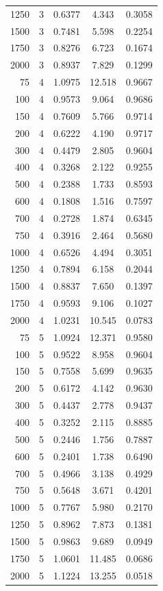 \begin{longtable}{rrccc}
1250 & 3 & 0.6377 & 4.343 & 0.3058 \\
1500 & 3 & 0.7481 & 5.598 & 0.2254 \\
1750 & 3 & 0.8276 & 6.723 & 0.1674 \\
2000 & 3 & 0.8937 & 7.829 & 0.1299 \\
75 & 4 & 1.0975 & 12.518 & 0.9667 \\
100 & 4 & 0.9573 & 9.064 & 0.9686 \\
150 & 4 & 0.7609 & 5.766 & 0.9714 \\
200 & 4 & 0.6222 & 4.190 & 0.9717 \\
300 & 4 & 0.4479 & 2.805 & 0.9604 \\
400 & 4 & 0.3268 & 2.122 & 0.9255 \\
500 & 4 & 0.2388 & 1.733 & 0.8593 \\
600 & 4 & 0.1808 & 1.516 & 0.7597 \\
700 & 4 & 0.2728 & 1.874 & 0.6345 \\
750 & 4 & 0.3916 & 2.464 & 0.5680 \\
1000 & 4 & 0.6526 & 4.494 & 0.3051 \\
1250 & 4 & 0.7894 & 6.158 & 0.2044 \\
1500 & 4 & 0.8837 & 7.650 & 0.1397 \\
1750 & 4 & 0.9593 & 9.106 & 0.1027 \\
2000 & 4 & 1.0231 & 10.545 & 0.0783 \\
75 & 5 & 1.0924 & 12.371 & 0.9580 \\
100 & 5 & 0.9522 & 8.958 & 0.9604 \\
150 & 5 & 0.7558 & 5.699 & 0.9635 \\
200 & 5 & 0.6172 & 4.142 & 0.9630 \\
300 & 5 & 0.4437 & 2.778 & 0.9437 \\
400 & 5 & 0.3252 & 2.115 & 0.8885 \\
500 & 5 & 0.2446 & 1.756 & 0.7887 \\
600 & 5 & 0.2401 & 1.738 & 0.6490 \\
700 & 5 & 0.4966 & 3.138 & 0.4929 \\
750 & 5 & 0.5648 & 3.671 & 0.4201 \\
1000 & 5 & 0.7767 & 5.980 & 0.2170 \\
1250 & 5 & 0.8962 & 7.873 & 0.1381 \\
1500 & 5 & 0.9863 & 9.689 & 0.0949 \\
1750 & 5 & 1.0601 & 11.485 & 0.0686 \\
2000 & 5 & 1.1224 & 13.255 & 0.0518 \\

\end{longtable}
